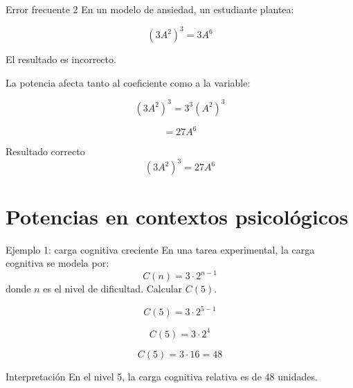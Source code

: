 \documentclass[aspectratio=169]{beamer}
\begin{document}
	\begin{frame}{Error frecuente 2}
		En un modelo de ansiedad, un estudiante plantea:
		
		\[
		(3A^2)^3=3A^6
		\]
		
		\pause
		
		\begin{alerta}
			El resultado es incorrecto.
		\end{alerta}
		
		\pause
		
		La potencia afecta tanto al coeficiente como a la variable:
		
		\[
		(3A^2)^3=3^3(A^2)^3
		\]
		
		\[
		=27A^6
		\]
		
		\pause
		
		\begin{block}{Resultado correcto}
			\[
			(3A^2)^3=27A^6
			\]
		\end{block}
	\end{frame}
	
	\section{Potencias en contextos psicológicos}
	
	\begin{frame}{Ejemplo 1: carga cognitiva creciente}
		En una tarea experimental, la carga cognitiva se modela por:
		\[
		C(n)=3\cdot 2^{n-1}
		\]
		donde \(n\) es el nivel de dificultad. Calcular $C(5)$.
		
		\[
		C(5)=3\cdot 2^{5-1}
		\]
		
		\[
		C(5)=3\cdot 2^4
		\]
		
		\[
		C(5)=3\cdot 16=48
		\]
		
		\begin{block}{Interpretación}
			En el nivel 5, la carga cognitiva relativa es de \(48\) unidades.
		\end{block}
	\end{frame}
	
\end{document}
